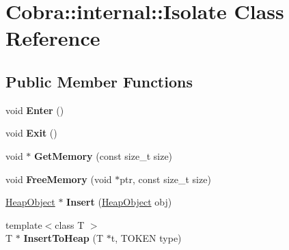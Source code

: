 \hypertarget{class_cobra_1_1internal_1_1_isolate}{\section{Cobra\+:\+:internal\+:\+:Isolate Class Reference}
\label{class_cobra_1_1internal_1_1_isolate}
}
\subsection*{Public Member Functions}
\begin{DoxyCompactItemize}
\item 
\hypertarget{class_cobra_1_1internal_1_1_isolate_abc6ce041311035d0e917119f6498d2db}{void {\bfseries Enter} ()}\label{class_cobra_1_1internal_1_1_isolate_abc6ce041311035d0e917119f6498d2db}

\item 
\hypertarget{class_cobra_1_1internal_1_1_isolate_aa966378a720680a07228f9a373ede884}{void {\bfseries Exit} ()}\label{class_cobra_1_1internal_1_1_isolate_aa966378a720680a07228f9a373ede884}

\item 
\hypertarget{class_cobra_1_1internal_1_1_isolate_a5703b9baedfd0f6933a509b8d01e6ade}{void $\ast$ {\bfseries Get\+Memory} (const size\+\_\+t size)}\label{class_cobra_1_1internal_1_1_isolate_a5703b9baedfd0f6933a509b8d01e6ade}

\item 
\hypertarget{class_cobra_1_1internal_1_1_isolate_a7601647b5c4a635c851f5a7358278b44}{void {\bfseries Free\+Memory} (void $\ast$ptr, const size\+\_\+t size)}\label{class_cobra_1_1internal_1_1_isolate_a7601647b5c4a635c851f5a7358278b44}

\item 
\hypertarget{class_cobra_1_1internal_1_1_isolate_a9dce7bc569dfe1265e0bf4bb0eabc8b6}{\hyperlink{struct_cobra_1_1internal_1_1_heap_object}{Heap\+Object} $\ast$ {\bfseries Insert} (\hyperlink{struct_cobra_1_1internal_1_1_heap_object}{Heap\+Object} obj)}\label{class_cobra_1_1internal_1_1_isolate_a9dce7bc569dfe1265e0bf4bb0eabc8b6}

\item 
\hypertarget{class_cobra_1_1internal_1_1_isolate_a10d48684b74fcdefaaddb264e2c1d121}{{\footnotesize template$<$class T $>$ }\\T $\ast$ {\bfseries Insert\+To\+Heap} (T $\ast$t, T\+O\+K\+E\+N type)}\label{class_cobra_1_1internal_1_1_isolate_a10d48684b74fcdefaaddb264e2c1d121}


\end{DoxyCompactItemize}
